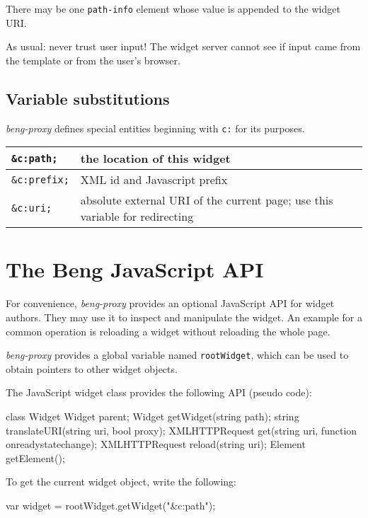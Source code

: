 \documentclass[a4paper,12pt]{article}
\begin{document}
There may be one \texttt{path-info} element whose value is appended to
the widget URI.

As usual: never trust user input!  The widget server cannot see if
input came from the template or from the user's browser.

\subsection{Variable substitutions}

\emph{beng-proxy} defines special entities beginning with \texttt{c:}
for its purposes.

\begin{tabular}{|l|p{8cm}|}
\hline
\texttt{\&c:path;} & the location of this widget \\
\hline
\texttt{\&c:prefix;} & XML id and Javascript prefix \\
\hline
\texttt{\&c:uri;} & absolute external URI of the current page; use
this variable for redirecting \\
\hline
\end{tabular}


\section{The Beng JavaScript API}

For convenience, \emph{beng-proxy} provides an optional JavaScript API
for widget authors.  They may use it to inspect and manipulate the
widget.  An example for a common operation is reloading a widget
without reloading the whole page.

\emph{beng-proxy} provides a global variable named
\texttt{rootWidget}, which can be used to obtain pointers to other
widget objects.

The JavaScript widget class provides the following API (pseudo code):

\begin{verbatim*}
class Widget {
  Widget parent;
  Widget getWidget(string path);
  string translateURI(string uri, bool proxy);
  XMLHTTPRequest get(string uri, function onreadystatechange);
  XMLHTTPRequest reload(string uri);
  Element getElement();
}
\end{verbatim*}

To get the current widget object, write the following:

\begin{verbatim*}
var widget = rootWidget.getWidget("&c:path");
\end{verbatim*}
\end{document}
